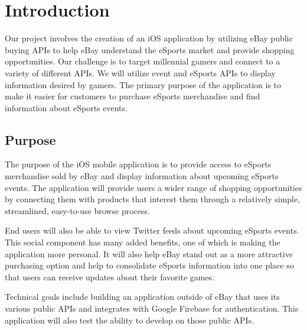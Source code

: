 \documentclass[onecolumn, draftclsnofoot,10pt, compsoc]{IEEEtran}
\begin{document}
\begin{titlepage}
\begin{singlespace}
\begin{abstract}
        \end{abstract}     
    \end{singlespace}
\end{titlepage}
\newpage
{}
\tableofcontents
\clearpage

\section{Introduction}
Our project involves the creation of an iOS application by utilizing eBay public buying APIs to help eBay understand the eSports market and provide shopping opportunities. 
Our challenge is to target millennial gamers and connect to a variety of different APIs. 
We will utilize event and eSports APIs to display information desired by gamers. 
The primary purpose of the application is to make it easier for customers to purchase eSports merchandise and find information about eSports events. 

\subsection{Purpose}
The purpose of the iOS mobile application is to provide access to eSports merchandise sold by eBay and display information about upcoming eSports events. The application will provide users a wider range of shopping opportunities by connecting them with products that interest them through a relatively simple, streamlined, easy-to-use browse process. 

\par End users will also be able to view Twitter feeds about upcoming eSports events. This social component has many added benefits, one of which is making the application more personal. It will also help eBay stand out as a more attractive purchasing option and help to consolidate eSports information into one place so that users can receive updates about their favorite games. 

\par Technical goals include building an application outside of eBay that uses its various public APIs and integrates with Google Firebase for authentication. This application will also test the ability to develop on those public APIs. 
\end{document}
